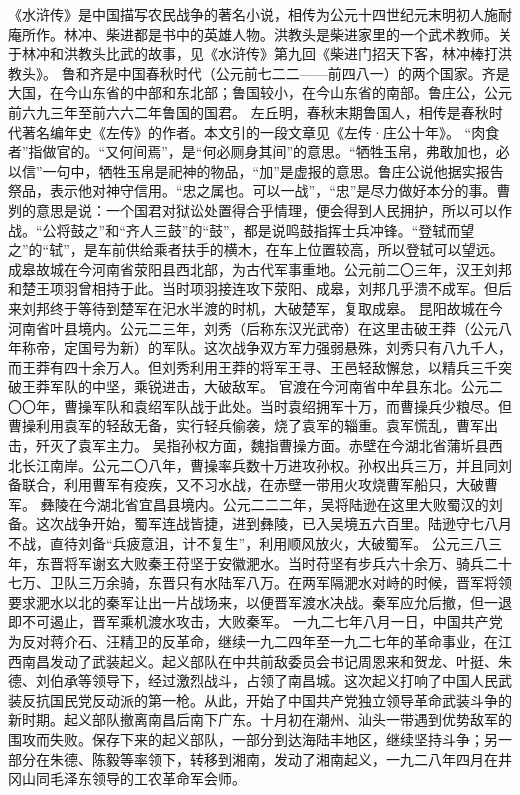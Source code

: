 \begin{maonote}
《水浒传》是中国描写农民战争的著名小说，相传为公元十四世纪元末明初人施耐庵所作。林冲、柴进都是书中的英雄人物。洪教头是柴进家里的一个武术教师。关于林冲和洪教头比武的故事，见《水浒传》第九回《柴进门招天下客，林冲棒打洪教头》。
鲁和齐是中国春秋时代（公元前七二二——前四八一）的两个国家。齐是大国，在今山东省的中部和东北部；鲁国较小，在今山东省的南部。鲁庄公，公元前六九三年至前六六二年鲁国的国君。
左丘明，春秋末期鲁国人，相传是春秋时代著名编年史《左传》的作者。本文引的一段文章见《左传·庄公十年》。
“肉食者”指做官的。“又何间焉”，是“何必厕身其间”的意思。“牺牲玉帛，弗敢加也，必以信”一句中，牺牲玉帛是祀神的物品，“加”是虚报的意思。鲁庄公说他据实报告祭品，表示他对神守信用。“忠之属也。可以一战”，“忠”是尽力做好本分的事。曹刿的意思是说：一个国君对狱讼处置得合乎情理，便会得到人民拥护，所以可以作战。“公将鼓之”和“齐人三鼓”的“鼓”，都是说鸣鼓指挥士兵冲锋。“登轼而望之”的“轼”，是车前供给乘者扶手的横木，在车上位置较高，所以登轼可以望远。
成皋故城在今河南省荥阳县西北部，为古代军事重地。公元前二〇三年，汉王刘邦和楚王项羽曾相持于此。当时项羽接连攻下荥阳、成皋，刘邦几乎溃不成军。但后来刘邦终于等待到楚军在汜水半渡的时机，大破楚军，复取成皋。
昆阳故城在今河南省叶县境内。公元二三年，刘秀（后称东汉光武帝）在这里击破王莽（公元八年称帝，定国号为新）的军队。这次战争双方军力强弱悬殊，刘秀只有八九千人，而王莽有四十余万人。但刘秀利用王莽的将军王寻、王邑轻敌懈怠，以精兵三千突破王莽军队的中坚，乘锐进击，大破敌军。
官渡在今河南省中牟县东北。公元二〇〇年，曹操军队和袁绍军队战于此处。当时袁绍拥军十万，而曹操兵少粮尽。但曹操利用袁军的轻敌无备，实行轻兵偷袭，烧了袁军的辎重。袁军慌乱，曹军出击，歼灭了袁军主力。
吴指孙权方面，魏指曹操方面。赤壁在今湖北省蒲圻县西北长江南岸。公元二〇八年，曹操率兵数十万进攻孙权。孙权出兵三万，并且同刘备联合，利用曹军有疫疾，又不习水战，在赤壁一带用火攻烧曹军船只，大破曹军。
彝陵在今湖北省宜昌县境内。公元二二二年，吴将陆逊在这里大败蜀汉的刘备。这次战争开始，蜀军连战皆捷，进到彝陵，已入吴境五六百里。陆逊守七八月不战，直待刘备“兵疲意沮，计不复生”，利用顺风放火，大破蜀军。
公元三八三年，东晋将军谢玄大败秦王苻坚于安徽淝水。当时苻坚有步兵六十余万、骑兵二十七万、卫队三万余骑，东晋只有水陆军八万。在两军隔淝水对峙的时候，晋军将领要求淝水以北的秦军让出一片战场来，以便晋军渡水决战。秦军应允后撤，但一退即不可遏止，晋军乘机渡水攻击，大败秦军。
一九二七年八月一日，中国共产党为反对蒋介石、汪精卫的反革命，继续一九二四年至一九二七年的革命事业，在江西南昌发动了武装起义。起义部队在中共前敌委员会书记周恩来和贺龙、叶挺、朱德、刘伯承等领导下，经过激烈战斗，占领了南昌城。这次起义打响了中国人民武装反抗国民党反动派的第一枪。从此，开始了中国共产党独立领导革命武装斗争的新时期。起义部队撤离南昌后南下广东。十月初在潮州、汕头一带遇到优势敌军的围攻而失败。保存下来的起义部队，一部分到达海陆丰地区，继续坚持斗争；另一部分在朱德、陈毅等率领下，转移到湘南，发动了湘南起义，一九二八年四月在井冈山同毛泽东领导的工农革命军会师。

\end{maonote}
